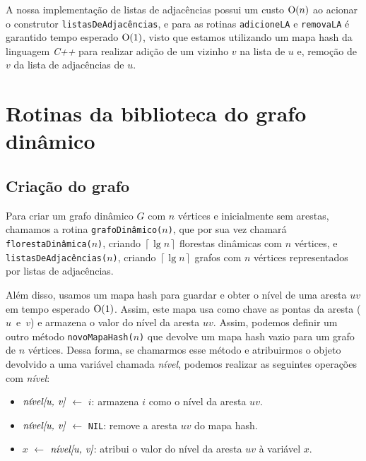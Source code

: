 A nossa implementação \cite{chung2025} de listas de adjacências possui um custo $\mathrm{O}(n)$ ao acionar o construtor \texttt{listasDeAdjacências}, e para 
as rotinas \texttt{adicioneLA} e \texttt{removaLA} é garantido tempo esperado $\mathrm{O}(1)$, visto que estamos utilizando um mapa hash da linguagem \textit{C++} para realizar adição de um vizinho $v$ na lista de $u$ e, remoção de $v$ da lista de adjacências de $u$.

\section{Rotinas da biblioteca do grafo dinâmico}
\label{sec:dynamic-graph-routines}

\subsection{Criação do grafo}
\label{sec:dynamic-graph-creation}

Para criar um grafo dinâmico $G$ com $n$ vértices e inicialmente sem arestas, chamamos a rotina \texttt{grafoDinâmico($n$)}, que por sua vez chamará \texttt{florestaDinâmica($n$)}, criando $\left\lceil \lg n \right\rceil$ florestas dinâmicas com $n$ vértices, e \texttt{listasDeAdjacências($n$)}, criando $\left\lceil \lg n \right\rceil$ grafos com $n$ vértices representados por listas de adjacências. 

Além disso, usamos um mapa hash para guardar e obter o nível de uma aresta $uv$ em tempo esperado $\mathrm{O}(1)$. Assim, este mapa usa como chave as pontas da aresta ($u$~e~$v$) e armazena o valor do nível da aresta $uv$. Assim, podemos definir um outro método \texttt{novoMapaHash($n$)} que devolve um mapa hash vazio para um grafo de $n$ vértices. Dessa forma, se chamarmos esse método e atribuirmos o objeto devolvido a uma variável chamada \textit{nível}, podemos realizar as seguintes operações com \textit{nível}:

\begin{itemize}
    \item $\emph{nível[u, v]}$ $\leftarrow$ $i$: armazena $i$ como o nível da aresta $uv$.
    
    \item $\emph{nível[u, v]}$ $\leftarrow$ \texttt{NIL}: remove a aresta $uv$ do mapa hash.
    
    \item $x$ $\leftarrow$ $\emph{nível[u, v]}$: atribui o valor do nível da aresta $uv$ à variável $x$. 
\end{itemize}

